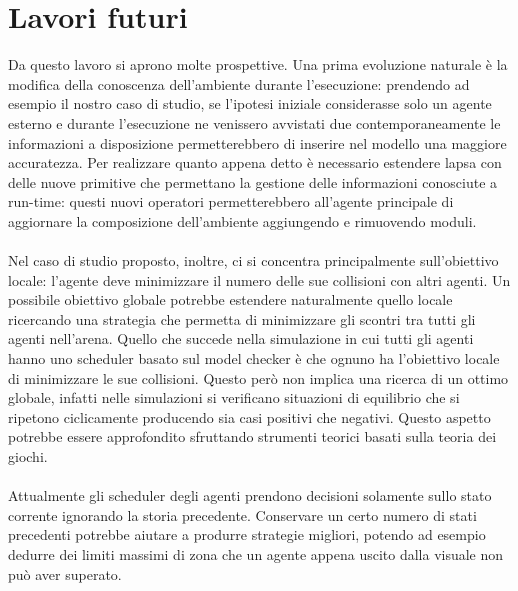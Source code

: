 \section{Lavori futuri} %
Da questo lavoro si aprono molte prospettive. Una prima evoluzione naturale è la modifica della conoscenza dell'ambiente durante l'esecuzione: prendendo ad esempio il nostro caso di studio, se l'ipotesi iniziale considerasse solo un agente esterno e durante l'esecuzione ne venissero avvistati due contemporaneamente le informazioni a disposizione permetterebbero di inserire nel modello una maggiore accuratezza. Per realizzare quanto appena detto è necessario estendere \ac{lapsa} con delle nuove primitive che permettano la gestione delle informazioni conosciute a run-time: questi nuovi operatori permetterebbero all'agente principale di aggiornare la composizione dell'ambiente aggiungendo e rimuovendo moduli.
\\ \\ %
Nel caso di studio proposto, inoltre, ci si concentra principalmente sull'obiettivo locale: l'agente deve minimizzare il numero delle sue collisioni con altri agenti. Un possibile obiettivo globale potrebbe estendere naturalmente quello locale ricercando una strategia che permetta di minimizzare gli scontri tra tutti gli agenti nell'arena. Quello che succede nella simulazione in cui tutti gli agenti hanno uno scheduler basato sul model checker è che ognuno ha l'obiettivo locale di minimizzare le sue collisioni. Questo però non implica una ricerca di un ottimo globale, infatti nelle simulazioni si verificano situazioni di equilibrio che si ripetono ciclicamente producendo sia casi positivi che negativi. Questo aspetto potrebbe essere approfondito sfruttando strumenti teorici basati sulla teoria dei giochi.
\\ \\ %
Attualmente gli scheduler degli agenti prendono decisioni solamente sullo stato corrente ignorando la storia precedente. Conservare un certo numero di stati precedenti potrebbe aiutare a produrre strategie migliori, potendo ad esempio dedurre dei limiti massimi di zona che un agente appena uscito dalla visuale non può aver superato.
